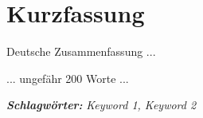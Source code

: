 
\section*{Kurzfassung}
\vspace{0.5cm}

Deutsche Zusammenfassung ...

... ungefähr 200 Worte ...

\vspace{0.5cm}
\textbf{\textit{Schlagwörter:}}
\textit{Keyword 1, Keyword 2}


